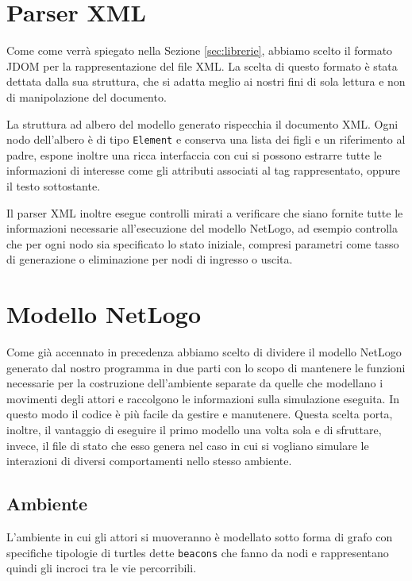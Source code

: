 \section{Parser XML}
\label{subsec:parser-builder}

Come come verrà spiegato nella Sezione \ref{sec:librerie}, abbiamo scelto il formato JDOM per la rappresentazione del file XML. La scelta di questo formato è stata dettata dalla sua struttura, che si adatta meglio ai nostri fini di sola lettura e non di manipolazione del documento.

La struttura ad albero del modello generato rispecchia il documento XML. Ogni nodo dell'albero è di tipo \texttt{Element} e conserva una lista dei figli e un riferimento al padre, espone inoltre una ricca interfaccia con cui si possono estrarre tutte le informazioni di interesse come gli attributi associati al tag rappresentato, oppure il testo sottostante.

Il parser XML inoltre esegue controlli mirati a verificare che siano fornite tutte le informazioni necessarie all'esecuzione del modello NetLogo, ad esempio controlla che per ogni nodo sia specificato lo stato iniziale, compresi parametri come tasso di generazione o eliminazione per nodi di ingresso o uscita.


\section{Modello NetLogo}
\label{sec:modello-netlogo}

Come già accennato in precedenza abbiamo scelto di dividere il modello NetLogo generato dal nostro programma in due parti con lo scopo di mantenere le funzioni necessarie per la costruzione dell'ambiente separate da quelle che modellano i movimenti degli attori e raccolgono le informazioni sulla simulazione eseguita. In questo modo il codice è più facile da gestire e manutenere. Questa scelta porta, inoltre, il vantaggio di eseguire il primo modello una volta sola e di sfruttare, invece, il file di stato che esso genera nel caso in cui si vogliano simulare le interazioni di diversi comportamenti nello stesso ambiente.
\subsection{Ambiente}
L'ambiente in cui gli attori si muoveranno è modellato sotto forma di grafo con specifiche tipologie di turtles dette \texttt{beacons} che fanno da nodi e rappresentano quindi gli incroci tra le vie percorribili.

